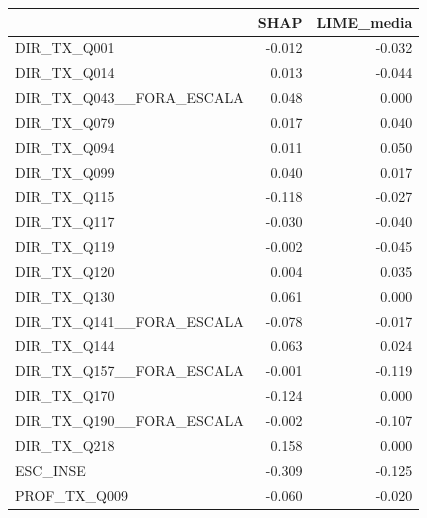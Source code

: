 \begin{tabular}{lrr}
\toprule
 & SHAP & LIME\_media \\
\midrule
DIR\_TX\_Q001 & -0.012 & -0.032 \\
DIR\_TX\_Q014 & 0.013 & -0.044 \\
DIR\_TX\_Q043\_\_FORA\_ESCALA & 0.048 & 0.000 \\
DIR\_TX\_Q079 & 0.017 & 0.040 \\
DIR\_TX\_Q094 & 0.011 & 0.050 \\
DIR\_TX\_Q099 & 0.040 & 0.017 \\
DIR\_TX\_Q115 & -0.118 & -0.027 \\
DIR\_TX\_Q117 & -0.030 & -0.040 \\
DIR\_TX\_Q119 & -0.002 & -0.045 \\
DIR\_TX\_Q120 & 0.004 & 0.035 \\
DIR\_TX\_Q130 & 0.061 & 0.000 \\
DIR\_TX\_Q141\_\_FORA\_ESCALA & -0.078 & -0.017 \\
DIR\_TX\_Q144 & 0.063 & 0.024 \\
DIR\_TX\_Q157\_\_FORA\_ESCALA & -0.001 & -0.119 \\
DIR\_TX\_Q170 & -0.124 & 0.000 \\
DIR\_TX\_Q190\_\_FORA\_ESCALA & -0.002 & -0.107 \\
DIR\_TX\_Q218 & 0.158 & 0.000 \\
ESC\_INSE & -0.309 & -0.125 \\
PROF\_TX\_Q009 & -0.060 & -0.020 \\
\bottomrule
\end{tabular}
